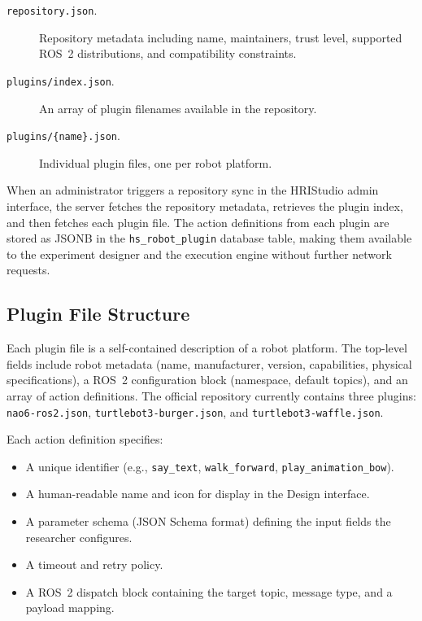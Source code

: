 \begin{description}
\item[\texttt{repository.json}.] Repository metadata including name, maintainers, trust level, supported ROS~2 distributions, and compatibility constraints.
\item[\texttt{plugins/index.json}.] An array of plugin filenames available in the repository.
\item[\texttt{plugins/\{name\}.json}.] Individual plugin files, one per robot platform.
\end{description}

When an administrator triggers a repository sync in the HRIStudio admin interface, the server fetches the repository metadata, retrieves the plugin index, and then fetches each plugin file. The action definitions from each plugin are stored as JSONB in the \texttt{hs\_robot\_plugin} database table, making them available to the experiment designer and the execution engine without further network requests.

\subsection{Plugin File Structure}

Each plugin file is a self-contained description of a robot platform. The top-level fields include robot metadata (name, manufacturer, version, capabilities, physical specifications), a ROS~2 configuration block (namespace, default topics), and an array of action definitions. The official repository currently contains three plugins: \texttt{nao6-ros2.json}, \texttt{turtlebot3-burger.json}, and \texttt{turtlebot3-waffle.json}.

Each action definition specifies:

\begin{itemize}
\item A unique identifier (e.g., \texttt{say\_text}, \texttt{walk\_forward}, \texttt{play\_animation\_bow}).
\item A human-readable name and icon for display in the Design interface.
\item A parameter schema (JSON Schema format) defining the input fields the researcher configures.
\item A timeout and retry policy.
\item A ROS~2 dispatch block containing the target topic, message type, and a payload mapping.
\end{itemize}

